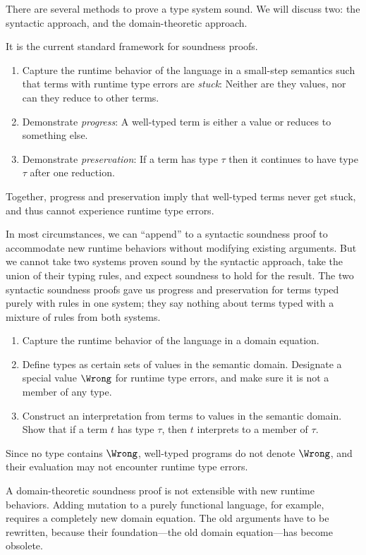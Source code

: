 \documentclass{amsart}
\begin{document}
There are several methods to prove a type system sound. We will
discuss two: the syntactic approach, and the domain-theoretic
approach.


It is the current standard framework for soundness proofs.
\begin{enumerate}
\item Capture the runtime behavior of the language in a
small-step semantics such that terms with runtime type errors are
\emph{stuck}: Neither are they values, nor can they reduce to
other terms.
\item Demonstrate \emph{progress}: A well-typed term is either a
value or reduces to something else.
\item Demonstrate \emph{preservation}: If a term has type $\tau$
then it continues to have type $\tau$ after one reduction.
\end{enumerate}
Together, progress and preservation imply that well-typed terms
never get stuck, and thus cannot experience runtime type errors.

In most circumstances, we can ``append'' to a syntactic soundness
proof to accommodate new runtime behaviors without modifying
existing arguments. But we cannot take two systems proven sound
by the syntactic approach, take the union of their typing rules,
and expect soundness to hold for the result. The two syntactic
soundness proofs gave us progress and preservation for terms
typed purely with rules in one system; they say nothing about
terms typed with a mixture of rules from both systems.


\begin{enumerate}
\item Capture the runtime behavior of the language in a domain
equation.
\item Define types as certain sets of values in the semantic
domain. Designate a special value $\Wrong$ for runtime type
errors, and make sure it is not a member of any type.
\item Construct an interpretation from terms to values in the
semantic domain. Show that if a term $t$ has type $\tau$, then
$t$ interprets to a member of $\tau$.
\end{enumerate}
Since no type contains $\Wrong$, well-typed programs do not
denote $\Wrong$, and their evaluation may not encounter runtime
type errors.

A domain-theoretic soundness proof is not extensible with new
runtime behaviors. Adding mutation to a purely functional
language, for example, requires a completely new domain equation.
The old arguments have to be rewritten, because their
foundation---the old domain equation---has become obsolete.
\end{document}
